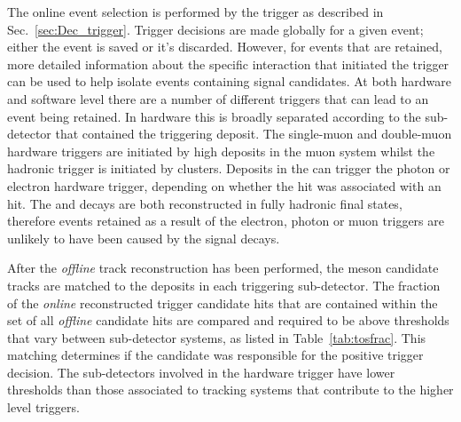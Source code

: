 The online event selection is performed by the \lhcb trigger as described in Sec.~\ref{sec:Dec_trigger}.
Trigger decisions are made globally for a given event; either the event is saved or it's discarded. However, for events that are retained, more detailed information about the specific interaction that initiated the trigger can be used to help isolate events containing signal candidates. At both hardware and software level there are a number of different triggers that can lead to an event being retained. In hardware this is broadly separated according to the sub-detector that contained the triggering deposit. 
The single-muon and double-muon hardware triggers are initiated by high \pt deposits in the muon system whilst the hadronic trigger is initiated by \hcal clusters.  
Deposits in the \ecal can trigger the photon or electron hardware trigger, depending on whether the hit was associated with an \spd hit.
The \decay{\Bp}{\Dsp\Kp\Km} and \decay{\Bp}{\Dsp}{\phiz} decays are both reconstructed in fully hadronic final states, therefore events retained as a result of the electron, photon or muon triggers are unlikely to have been caused by the signal decays. 

After the \emph{offline} track reconstruction has been performed, the \Bp meson candidate tracks are matched to the deposits in each triggering sub-detector.
The fraction of the \emph{online} reconstructed trigger candidate hits that are contained within the set of all \emph{offline} \Bp candidate hits are compared and required to be above thresholds that vary between sub-detector systems, as listed in Table~\ref{tab:tosfrac}. This matching determines if the candidate was responsible for the positive trigger decision. The sub-detectors involved in the hardware trigger have lower thresholds than those associated to tracking systems that contribute to the higher level triggers.  




